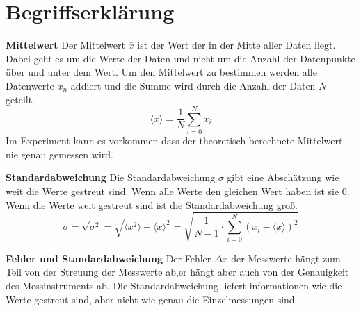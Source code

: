 \documentclass[titlepage = firstcover]{scrartcl}
\begin{document}
\section{Begriffserklärung}
\begin{description}
\item{\textbf{Mittelwert}} \newline
    Der Mittelwert $\bar{x}$ ist der Wert der in der Mitte aller Daten liegt. Dabei geht es um die Werte der Daten und nicht um die Anzahl der Datenpunkte über und unter dem Wert. Um den Mittelwert zu bestimmen werden alle Datenwerte $x_n$ addiert und die Summe wird durch die Anzahl der Daten $N$ geteilt.
    \begin{equation}
        \langle x\rangle = \frac{1}{N} \sum \limits_{i=0}^{N}x_i
    \end{equation}
    Im Experiment kann es vorkommen dass der theoretisch berechnete Mittelwert nie genau gemessen wird.
\item{\textbf{Standardabweichung}} \newline
    Die Standardabweichung $\sigma$ gibt eine Abschätzung wie weit die Werte gestreut sind. Wenn alle Werte den gleichen Wert haben ist sie 0. Wenn die Werte weit gestreut sind ist die Standardabweichung groß.
    \begin{equation}
        \sigma = \sqrt{\sigma^2} = \sqrt{\langle x^2 \rangle -\langle x\rangle^2} = \sqrt{\frac{1}{N-1} \cdot \sum_{i=0}^{N} \left(x_i-\langle x \rangle\right)^2 }
    \end{equation}
\item{\textbf{Fehler und Standardabweichung}} \newline
    Der Fehler $\Delta x$ der Messwerte hängt zum Teil von der Streuung der Messwerte ab,er hängt aber auch von der Genauigkeit des Messinstruments ab. Die Standardabweichung liefert informationen wie die Werte gestreut sind, aber nicht wie genau die Einzelmessungen sind.
\end{description} 
\end{document}
